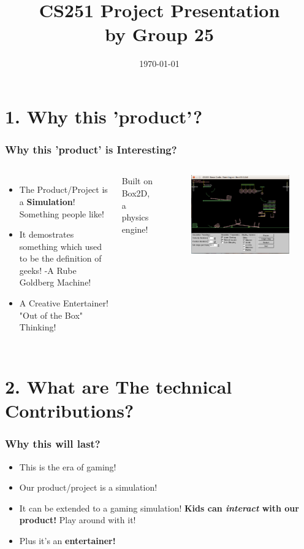 \documentclass{beamer}
\title{\textbf{CS251 Project Presentation}\\ \large by Group 25}
\author[Sohum \& Himanshu \& Aakash]
{%
  \texorpdfstring{
    \begin{columns}%
      \column{.30\linewidth}
      \centering
      Sohum Dhar\\
      \emph{140070001\\
      \href{mailto:140070001@iitb.ac.in}{140070001@iitb.ac.in}}
      \column{.30\linewidth}
      \centering
      Himanshu Payal\\
      \emph{140050011\\
      \href{mailto:140050011.iitb.ac.in}{140050011.iitb.ac.in}}
    \column{.30\linewidth}
      \centering
      Aakash Praliya\\
      \emph{140050012\\
      \href{mailto:140050012.iitb.ac.in}{140050012.iitb.ac.in}}
    \end{columns}
  }
  {Sohum Dhar \& Himanshu Payal \& Aakash Praliya}
}
\date{\today}
\begin{document}
\frame{\titlepage} 

\section{1. Why this 'product'?}
\begin{frame}
\frametitle{Why this 'product' is Interesting?} \begin{columns}%
	\begin{itemize}
   	\item The Product/Project is a \textbf{Simulation}! Something people like!\pause
   	\item It demostrates something which used to be the definition of geeks! -A Rube Goldberg Machine! \pause
   \item A Creative Entertainer! "Out of the Box" Thinking!
   \end{itemize}
    \centering 
 	 Built on Box2D, a physics engine!    
  	\begin{figure}
   	\includegraphics[width=0.7 \linewidth]{latex/box2d_prelim2.png}
	\end{figure} 
\end{columns} 
\end{frame}


\section{2. What are The technical Contributions?}
\begin{frame}
\frametitle{Why this will last?} 
\begin{itemize}
   \item This is the era of gaming!\pause
   \item Our product/project is a simulation! \pause
   \item It can be extended to a gaming simulation! \textbf{Kids can \emph{interact} with our product!} Play around with it! \pause
   \item Plus it's an \textbf{entertainer!}
\end{itemize} 
\end{frame}
\end{document}
